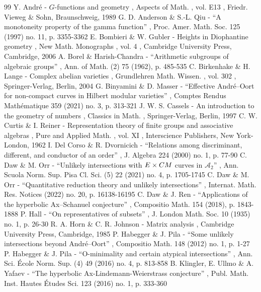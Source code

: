 \documentclass[11pt]{article}
\numberwithin{equation}{section}
\begin{document}

\begin{thebibliography}{99}
 Y. André - $G$-functions and geometry , Aspects of Math. , vol. E13 , Friedr. Vieweg \& Sohn, Braunschweig, 1989
 G. D. Anderson \& S.-L. Qiu - “A monotoneity property of the gamma function” , Proc. Amer. Math. Soc. 125 (1997) no. 11, p. 3355-3362
 E. Bombieri \& W. Gubler - Heights in Diophantine geometry , New Math. Monographs , vol. 4 , Cambridge University Press, Cambridge, 2006
 A. Borel \& Harish-Chandra - “Arithmetic subgroups of algebraic groups” , Ann. of Math. (2) 75 (1962), p. 485-535
 C. Birkenhake \& H. Lange - Complex abelian varieties , Grundlehren Math. Wissen. , vol. 302 , Springer-Verlag, Berlin, 2004
 G. Binyamini \& D. Masser - “Effective André–Oort for non-compact curves in Hilbert modular varieties” , Comptes Rendus Mathématique 359 (2021) no. 3, p. 313-321
 J. W. S. Cassels - An introduction to the geometry of numbers , Classics in Math. , Springer-Verlag, Berlin, 1997
 C. W. Curtis \& I. Reiner - Representation theory of finite groups and associative algebras , Pure and Applied Math. , vol. XI , Interscience Publishers, New York-London, 1962
 I. Del Corso \& R. Dvornicich - “Relations among discriminant, different, and conductor of an order” , J. Algebra 224 (2000) no. 1, p. 77-90
 C. Daw \& M. Orr - “Unlikely intersections with $E\times {\rm CM}$ curves in $\mathcal{A}_2$” , Ann. Scuola Norm. Sup. Pisa Cl. Sci. (5) 22 (2021) no. 4, p. 1705-1745
 C. Daw \& M. Orr - “Quantitative reduction theory and unlikely intersections” , Internat. Math. Res. Notices (2022) no. 20, p. 16138-16195
 C. Daw \& J. Ren - “Applications of the hyperbolic Ax–Schanuel conjecture” , Compositio Math. 154 (2018), p. 1843-1888
 P. Hall - “On representatives of subsets” , J. London Math. Soc. 10 (1935) no. 1, p. 26-30
 R. A. Horn \& C. R. Johnson - Matrix analysis , Cambridge University Press, Cambridge, 1985
 P. Habegger \& J. Pila - “Some unlikely intersections beyond André–Oort” , Compositio Math. 148 (2012) no. 1, p. 1-27
 P. Habegger \& J. Pila - “O-minimality and certain atypical intersections” , Ann. Sci. École Norm. Sup. (4) 49 (2016) no. 4, p. 813-858
 B. Klingler, E. Ullmo \& A. Yafaev - “The hyperbolic Ax-Lindemann-Weierstrass conjecture” , Publ. Math. Inst. Hautes Études Sci. 123 (2016) no. 1, p. 333-360

\end{thebibliography}
\end{document}
